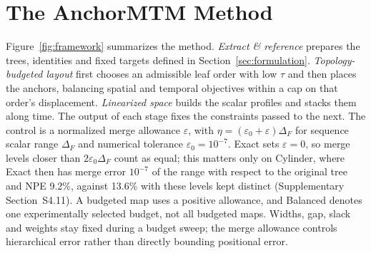 \begin{figure}[!tb]
\end{figure}
\section{The AnchorMTM Method}\label{sec:method}\label{sec:construction}

Figure~\ref{fig:framework} summarizes the method. \emph{Extract \& reference} prepares the trees, identities and fixed targets defined in Section~\ref{sec:formulation}. \emph{Topology-budgeted layout} first chooses an admissible leaf order with low $\tau$ and then places the anchors, balancing spatial and temporal objectives within a cap on that order's displacement. \emph{Linearized space} builds the scalar profiles and stacks them along time. The output of each stage fixes the constraints passed to the next. The control is a normalized merge allowance $\varepsilon$, with $\eta=(\varepsilon_0+\varepsilon)\Delta_F$ for sequence scalar range $\Delta_F$ and numerical tolerance $\varepsilon_0=10^{-7}$. Exact sets $\varepsilon=0$, so merge levels closer than $2\varepsilon_0\Delta_F$ count as equal; this matters only on Cylinder, where Exact then has merge error $10^{-7}$ of the range with respect to the original tree and NPE 9.2\%, against 13.6\% with these levels kept distinct (Supplementary Section~S4.11). A budgeted map uses a positive allowance, and Balanced denotes one experimentally selected budget, not all budgeted maps. Widths, gap, slack and weights stay fixed during a budget sweep; the merge allowance controls hierarchical error rather than directly bounding positional error.

